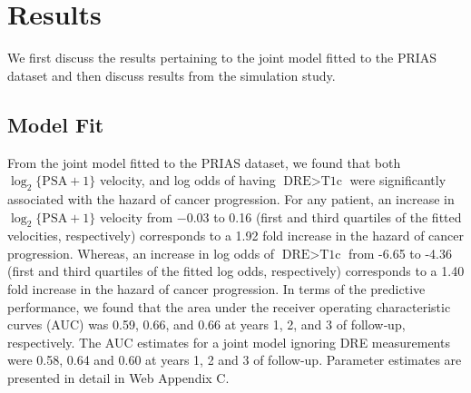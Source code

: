 
\section{Results}
\label{sec:results}
We first discuss the results pertaining to the joint model fitted to the PRIAS dataset and then discuss results from the simulation study.
\subsection{Model Fit}
From the joint model fitted to the PRIAS dataset, we found that both $\log_2 \{\mbox{PSA} + 1\}$ velocity,  and log odds of having $\mbox{DRE} > \mbox{T1c}$  were significantly associated with the hazard of cancer progression. For any patient, an increase in $\log_2 \{\mbox{PSA} + 1\}$ velocity from −0.03 to 0.16 (first and third quartiles of the fitted velocities, respectively) corresponds to a 1.92 fold increase in the hazard of cancer progression. Whereas, an increase in log odds of $\mbox{DRE} > \mbox{T1c}$ from -6.65 to -4.36 (first and third quartiles of the fitted log odds, respectively) corresponds to a 1.40 fold increase in the hazard of cancer progression. In terms of the predictive performance, we found that the area under the receiver operating characteristic curves (AUC) \cite{landmarking2017} was 0.59, 0.66, and 0.66 at years 1, 2, and 3 of follow‐up, respectively. The AUC estimates for a joint model ignoring DRE measurements were 0.58, 0.64 and 0.60 at years 1, 2 and 3 of follow-up. Parameter estimates are presented in detail in Web Appendix C.

